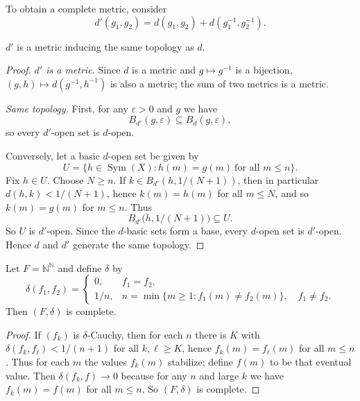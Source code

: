 To obtain a complete metric, consider
\[
    d'(g_1, g_2) = d(g_1, g_2) + d(g_1^{-1}, g_2^{-1}).
\]


\begin{lemma}
    $d'$ is a metric inducing the same topology as $d$.
\end{lemma}

\begin{proof}
    \emph{$d'$ is a metric.} Since $d$ is a metric and $g\mapsto g^{-1}$ is a bijection, $(g,h)\mapsto d(g^{-1},h^{-1})$ is also a metric; the sum of two metrics is a metric.

    \emph{Same topology.} First, for any $\varepsilon>0$ and $g$ we have
    \[
        B_{d'}(g,\varepsilon)\subseteq B_{d}(g,\varepsilon),
    \]
    so every $d'$-open set is $d$-open.

    Conversely, let a basic $d$-open set be given by
    \[
        U=\{h\in \operatorname{Sym}(X): h(m)=g(m)\ \text{for all } m\le n\}.
    \]
    Fix $h\in U$. Choose $N\ge n$. If $k\in B_{d'}(h,1/(N+1))$, then in particular
    $d(h,k)<1/(N+1)$, hence $k(m)=h(m)$ for all $m\le N$, and so $k(m)=g(m)$ for $m\le n$.
    Thus
    \[
        B_{d'}\bigl(h,1/(N+1)\bigr)\subseteq U.
    \]
    So $U$ is $d'$-open. Since the $d$-basic sets form a base, every $d$-open set is $d'$-open.
    Hence $d$ and $d'$ generate the same topology.
\end{proof}


\begin{proposition}
    Let $F=\mathbb N^{\mathbb N}$ and define $\delta$ by
    \[
        \delta(f_1,f_2)=
        \begin{cases}
            0,   & f_1=f_2,                                            \\[2pt]
            1/n, & n=\min\{m\ge1: f_1(m)\ne f_2(m)\},\quad f_1\ne f_2.
        \end{cases}
    \]
    Then $(F,\delta)$ is complete.
\end{proposition}

\begin{proof}
    If $(f_k)$ is $\delta$-Cauchy, then for each $n$ there is $K$ with
    $\delta(f_k,f_\ell)<1/(n+1)$ for all $k,\ell\ge K$, hence $f_k(m)=f_\ell(m)$ for all
    $m\le n$. Thus for each $m$ the values $f_k(m)$ stabilize; define $f(m)$ to be that
    eventual value. Then $\delta(f_k,f)\to 0$ because for any $n$ and large $k$ we have
    $f_k(m)=f(m)$ for all $m\le n$. So $(F,\delta)$ is complete.
\end{proof}


